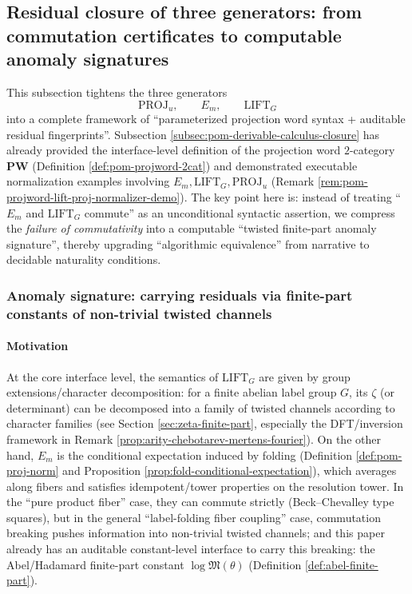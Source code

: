 \subsection{Residual closure of three generators: from commutation certificates to computable anomaly signatures}\label{subsec:pom-three-generator-residual-closure}

This subsection tightens the three generators
$$
\mathrm{PROJ}_u,\qquad E_m,\qquad \mathrm{LIFT}_G
$$
into a complete framework of ``parameterized projection word syntax + auditable residual fingerprints''.
Subsection \ref{subsec:pom-derivable-calculus-closure} has already provided the interface-level definition of the projection word $2$-category $\mathbf{PW}$ (Definition \ref{def:pom-projword-2cat}) and demonstrated executable normalization examples involving \(E_m,\mathrm{LIFT}_G,\mathrm{PROJ}_u\) (Remark \ref{rem:pom-projword-lift-proj-normalizer-demo}).
The key point here is: instead of treating ``\(E_m\) and \(\mathrm{LIFT}_G\) commute'' as an unconditional syntactic assertion, we compress the \emph{failure of commutativity} into a computable ``twisted finite-part anomaly signature'', thereby upgrading ``algorithmic equivalence'' from narrative to decidable naturality conditions.

\subsubsection{Anomaly signature: carrying residuals via finite-part constants of non-trivial twisted channels}\label{subsec:pom-anom-signature}

\paragraph{Motivation}
At the core interface level, the semantics of \(\mathrm{LIFT}_G\) are given by group extensions/character decomposition: for a finite abelian label group \(G\), its \(\zeta\) (or determinant) can be decomposed into a family of twisted channels according to character families (see Section \ref{sec:zeta-finite-part}, especially the DFT/inversion framework in Remark \ref{prop:arity-chebotarev-mertens-fourier}).
On the other hand, \(E_m\) is the conditional expectation induced by folding (Definition \ref{def:pom-proj-norm} and Proposition \ref{prop:fold-conditional-expectation}), which averages along fibers and satisfies idempotent/tower properties on the resolution tower.
In the ``pure product fiber'' case, they can commute strictly (Beck--Chevalley type squares), but in the general ``label-folding fiber coupling'' case, commutation breaking pushes information into non-trivial twisted channels; and this paper already has an auditable constant-level interface to carry this breaking: the Abel/Hadamard finite-part constant \(\log\mathfrak{M}(\theta)\) (Definition \ref{def:abel-finite-part}).

